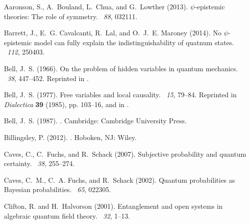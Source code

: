 \documentclass[12pt]{article}
\begin{document}
\newpage

\begin{thebibliography}{50}

Aaronson, S., A.~Bouland, L.~Chua, and G.~Lowther (2013).
\newblock $\psi$-epistemic theories: The role of symmetry.
~{\em 88}, 032111.

Barrett, J., E.~G. Cavalcanti, R.~Lal, and O.~J.~E. Maroney (2014).
\newblock No $\psi$-epistemic model can fully explain the indistinguishability
  of quatnum states.
~{\em 112}, 250403.

Bell, J.~S. (1966).
\newblock On the problem of hidden variables in quantum mechanics.
~{\em 38}, 447--452.
\newblock Reprinted in \citet[pp. 1--13]{BellBook}.

Bell, J.~S. (1977).
\newblock Free variables and local causality.
~{\em 15}, 79--84.
\newblock Reprinted in \emph{Dialectica} \textbf{39} (1985), pp. 103--16, and
  in \citet[pp. 100--104]{BellBook}.

Bell, J.~S. (1987).
.
\newblock Cambridge: Cambridge University Press.

Billingsley, P. (2012).
.
\newblock Hoboken, NJ: Wiley.

Caves, C., C.~Fuchs, and R.~Schack (2007).
\newblock Subjective probability and quantum certainty.
~{\em 38},
  255--274.

Caves, C.~M., C.~A. Fuchs, and R.~Schack (2002).
\newblock Quantum probabilities as {B}ayesian probabilities.
~{\em 65}, 022305.

Clifton, R. and H.~Halvorson (2001).
\newblock Entanglement and open systems in algebraic quantum field theory.
~{\em 32},
  1--13.


\end{thebibliography}
\end{document}
